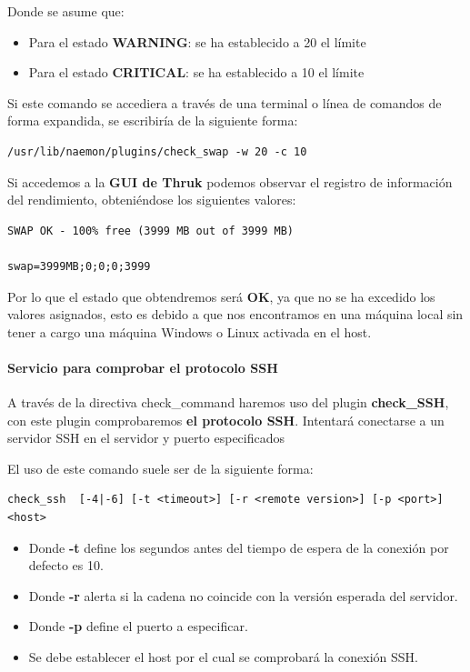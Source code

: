 Donde se asume que:
\begin{itemize}
	\item Para el estado \textbf{WARNING}: se ha establecido a 20 el límite
	\item Para el estado \textbf{CRITICAL}: se ha establecido a 10 el límite
\end{itemize}

Si este comando se accediera a través de una terminal o línea de comandos de forma expandida, se escribiría de la siguiente forma:

\begin{lstlisting}
/usr/lib/naemon/plugins/check_swap -w 20 -c 10
\end{lstlisting}

Si accedemos a la \textbf{GUI de Thruk} podemos observar el registro de información del rendimiento, obteniéndose los siguientes valores:

\begin{lstlisting}
SWAP OK - 100% free (3999 MB out of 3999 MB)

swap=3999MB;0;0;0;3999

\end{lstlisting}

Por lo que el estado que obtendremos será \textbf{OK}, ya que no se ha excedido los valores asignados, esto es debido a que nos encontramos en una máquina local sin tener a cargo una máquina Windows o Linux activada en el host.

\paragraph{Servicio para comprobar el protocolo SSH}

A través de la directiva check\_command haremos uso del plugin \textbf{check\_SSH}, con este plugin comprobaremos \textbf{el protocolo SSH}. Intentará conectarse a un servidor SSH en el servidor y puerto especificados

El uso de este comando suele ser de la siguiente forma:
\begin{lstlisting}
check_ssh  [-4|-6] [-t <timeout>] [-r <remote version>] [-p <port>] <host>
\end{lstlisting}
\newpage
\begin{itemize}
	\item Donde\textbf{ -t } define los segundos antes del tiempo de espera de la conexión por defecto es 10.
	\item Donde\textbf{ -r } alerta si la cadena no coincide con la versión esperada del servidor.
	\item Donde\textbf{ -p } define el puerto a especificar.
	\item Se debe establecer el host por el cual se comprobará la conexión SSH.
\end{itemize}

